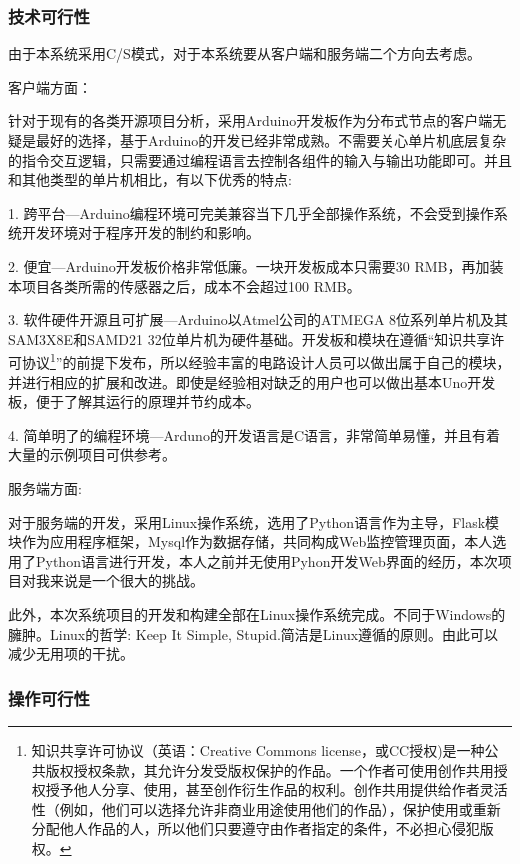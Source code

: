 \subsubsection{技术可行性}

由于本系统采用C/S模式，对于本系统要从客户端和服务端二个方向去考虑。

客户端方面：

针对于现有的各类开源项目分析，采用Arduino开发板作为分布式节点的客户端无疑是最好的选择，基于Arduino的开发已经非常成熟。不需要关心单片机底层复杂的指令交互逻辑，只需要通过编程语言去控制各组件的输入与输出功能即可。并且和其他类型的单片机相比，有以下优秀的特点:

1. 跨平台---Arduino编程环境可完美兼容当下几乎全部操作系统，不会受到操作系统开发环境对于程序开发的制约和影响。

2. 便宜---Arduino开发板价格非常低廉。一块开发板成本只需要30 RMB，再加装本项目各类所需的传感器之后，成本不会超过100 RMB。

3. 软件硬件开源且可扩展---Arduino以Atmel公司的ATMEGA 8位系列单片机及其SAM3X8E和SAMD21 32位单片机为硬件基础。开发板和模块在遵循“知识共享许可协议\footnote{知识共享许可协议（英语：Creative Commons license，或CC授权)是一种公共版权授权条款，其允许分发受版权保护的作品。一个作者可使用创作共用授权授予他人分享、使用，甚至创作衍生作品的权利。创作共用提供给作者灵活性（例如，他们可以选择允许非商业用途使用他们的作品），保护使用或重新分配他人作品的人，所以他们只要遵守由作者指定的条件，不必担心侵犯版权。}”的前提下发布，所以经验丰富的电路设计人员可以做出属于自己的模块，并进行相应的扩展和改进。即使是经验相对缺乏的用户也可以做出基本Uno开发板，便于了解其运行的原理并节约成本。

4. 简单明了的编程环境---Arduno的开发语言是C语言，非常简单易懂，并且有着大量的示例项目可供参考。

服务端方面:

对于服务端的开发，采用Linux操作系统，选用了Python语言作为主导，Flask模块作为应用程序框架，Mysql作为数据存储，共同构成Web监控管理页面，本人选用了Python语言进行开发，本人之前并无使用Pyhon开发Web界面的经历，本次项目对我来说是一个很大的挑战。

此外，本次系统项目的开发和构建全部在Linux操作系统完成。不同于Windows的臃肿。Linux的哲学: Keep It Simple, Stupid.简洁是Linux遵循的原则。由此可以减少无用项的干扰。

\subsubsection{操作可行性}

